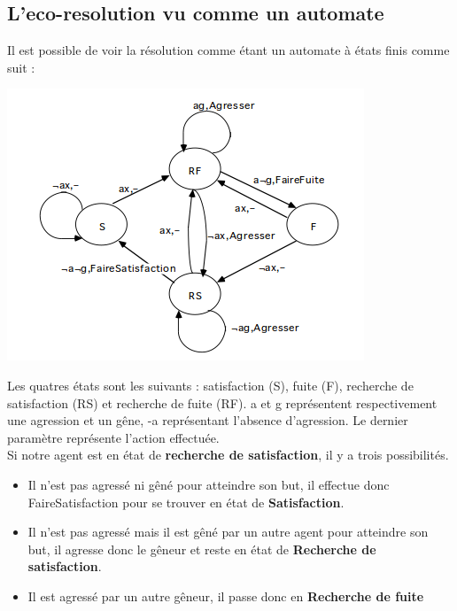         \subsection{L'eco-resolution vu comme un automate}
            Il est possible de voir la résolution comme étant un automate à états finis comme suit : \\
            \begin{center}
                \includegraphics[scale=0.7]{images/AutomateEcoResolution.png}
            \end{center}
            Les quatres états sont les suivants : satisfaction (S), fuite (F), recherche de satisfaction (RS) et recherche de fuite (RF). a et g représentent respectivement une agression et un gêne, -a représentant l'absence d'agression. Le dernier paramètre représente l'action effectuée. \\

            Si notre agent est en état de \textbf{recherche de satisfaction}, il y a trois possibilités. \\
            \begin{itemize}
                \item Il n'est pas agressé ni gêné pour atteindre son but, il effectue donc FaireSatisfaction pour se trouver en état de \textbf{Satisfaction}.
                \item Il n'est pas agressé mais il est gêné par un autre agent pour atteindre son but, il agresse donc le gêneur et reste en état de \textbf{Recherche de satisfaction}.
                \item Il est agressé par un autre gêneur, il passe donc en \textbf{Recherche de fuite}
            \end{itemize} ~\\

